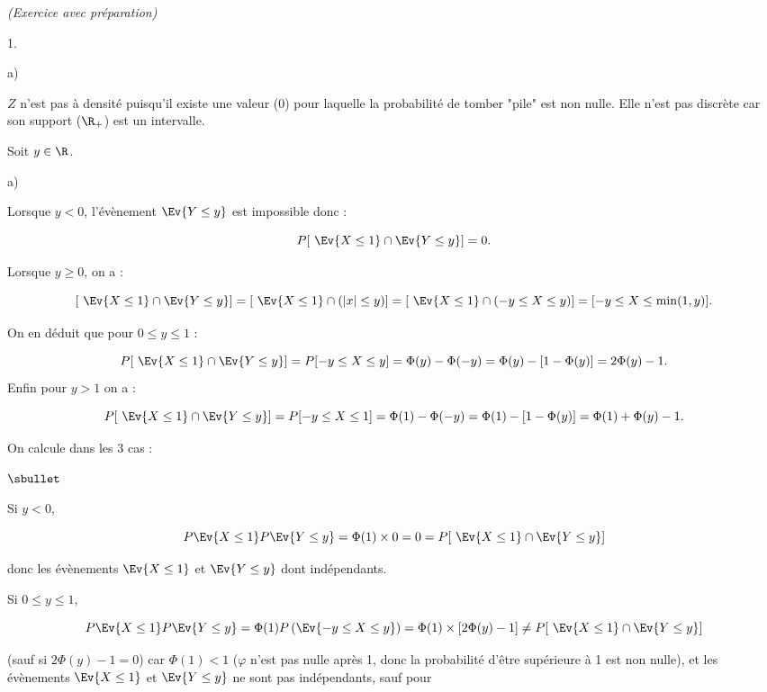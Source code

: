 \documentclass[11pt]{article}%
\begin{document}
\begin{exercice}{\it (Exercice avec préparation)}
\begin{noliste}{1.}
\begin{noliste}{a)}
 \item $Z$ n'est pas à densité puisqu'il existe une valeur (0) pour
laquelle la probabilité de tomber "pile" est non nulle. Elle n'est pas
discrète car son support ($\R_+ $) est un intervalle. \\

 \end{noliste}

 \item Soit $y \in \R$. \begin{noliste}{a)}
 \setlength{\itemsep}{2mm}

 \item Lorsque $y< 0$, l'évènement $\Ev{ Y \leq y} $ est impossible
donc :
 
\[
 P [ \ \Ev{X \leq 1 } \cap \Ev{Y \leq y } ] = 0. 
\]

 Lorsque $y \geq 0$, on a : 
 
\[
 [ \ \Ev{X \leq 1 } \cap \Ev{Y \leq y} ] = [ \ \Ev{ X \leq 1 } \cap ( |
x | \leq y ) ] = [ \ \Ev{ X \leq 1 } \cap ( -y \leq X \leq y ) ] = [ -y
\leq X \leq \min (1, y) ]. 
\]

 On en déduit que pour $0 \leq y \leq 1$ :
 
\[
 P [ \ \Ev{X \leq 1 } \cap \Ev{Y \leq y} ] = P [ -y \leq X \leq y ] =
\Phi ( y) - \Phi ( -y) = \Phi (y) - [ 1 - \Phi (y) ] = 2 \Phi ( y) - 1.
\]
 Enfin pour $y > 1$ on a :
 
\[
 P [ \ \Ev{X \leq 1 } \cap \Ev{Y \leq y} ] = P [ -y \leq X \leq 1 ] =
\Phi ( 1) - \Phi ( -y) = \Phi (1) - [ 1 - \Phi (y) ] = \Phi (1) + \Phi
( y) - 1. 
\]
 \item On calcule dans les 3 cas : \begin{noliste}{$\sbullet$}

 \item Si $y< 0$,
 
\[
 P \Ev{ X \leq 1 } P \Ev{ Y \leq y } = \Phi (1) \times 0 = 0 = P [ \
\Ev{X \leq 1 } \cap \Ev{Y \leq y } ] 
\]

 donc les évènements $\Ev{X \leq 1}$ et $\Ev{Y \leq y}$ dont
indépendants. \\

 \item Si $0 \leq y \leq 1$,
 
\[
 P \Ev{ X \leq 1 } P \Ev{ Y \leq y } = \Phi ( 1 ) P \left(\Ev{ - y \leq
X \leq y }\right) = \Phi (1) \times \left[ 2 \Phi (y) - 1 \right] \neq
P [ \ \Ev{X \leq 1 } \cap \Ev{Y \leq y } ] 
\]

 (sauf si $ 2 \Phi ( y) - 1 = 0$) car $\Phi (1) < 1$ ($\varphi$ n'est
pas nulle après 1, donc la probabilité d'être supérieure à 1 est non
nulle), et les évènements $\Ev{X \leq 1}$ et $\Ev{Y \leq y}$ ne sont
pas indépendants, sauf pour 
 

\end{noliste}
\end{noliste}
\end{noliste}
\end{exercice}
\end{document}
